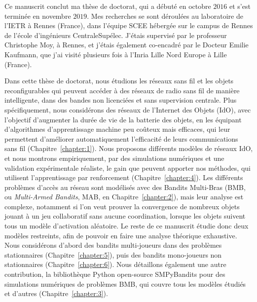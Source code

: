 \begin{resume_fr}



Ce manuscrit conclut ma thèse de doctorat, qui a débuté en octobre $2016$ et s'est terminée en novembre $2019$.
Mes recherches se sont déroulées au laboratoire de l'IETR à Rennes (France), dans l'équipe SCEE hébergée sur le campus de Rennes de l'école d'ingénieurs CentraleSupélec.
J'étais supervisé par le professeur Christophe Moy, à Rennes,
et j'étais également co-encadré par le Docteur Emilie Kaufmann, que j'ai visité plusieurs fois à l'Inria Lille Nord Europe à Lille (France).


Dans cette thèse de doctorat, nous étudions les réseaux sans fil et les objets reconfigurables qui peuvent accéder à des réseaux de radio sans fil de manière intelligente, dans des bandes non licenciées et sans supervision centrale.
Plus spécifiquement, nous considérons des réseaux de l'Internet des Objets (IdO), avec l'objectif d'augmenter la durée de vie de la batterie des objets, en les équipant d'algorithmes d'apprentissage machine peu coûteux mais efficaces, qui leur permettent d'améliorer automatiquement l'efficacité de leurs communications sans fil (Chapitre~\ref{chapter:1}).
Nous proposons différents modèles de réseaux IdO, et nous montrons empiriquement, par des simulations numériques et une validation expérimentale réaliste, le gain que peuvent apporter nos méthodes, qui utilisent l'apprentissage par renforcement (Chapitre~\ref{chapter:4}).
Les différents problèmes d'accès au réseau sont modélisés avec des Bandits Multi-Bras (BMB, ou \emph{Multi-Armed Bandits}, MAB, en Chapitre~\ref{chapter:2}), mais leur analyse est complexe,
notamment si l'on veut prouver la convergence de nombreux objets jouant à un jeu collaboratif sans aucune coordination, lorsque les objets suivent tous un modèle d'activation aléatoire.
Le reste de ce manuscrit étudie donc deux modèles restreints, afin de pouvoir en faire une analyse théorique exhaustive.
Nous considérons d'abord des bandits multi-joueurs dans des problèmes stationnaires (Chapitre~\ref{chapter:5}), puis des bandits mono-joueurs non stationnaires (Chapitre~\ref{chapter:6}).
Nous détaillons également une autre contribution, la bibliothèque Python open-source SMPyBandits pour des simulations numériques de problèmes BMB, qui couvre tous les modèles étudiés et d'autres (Chapitre~\ref{chapter:3}).



\end{resume_fr}

